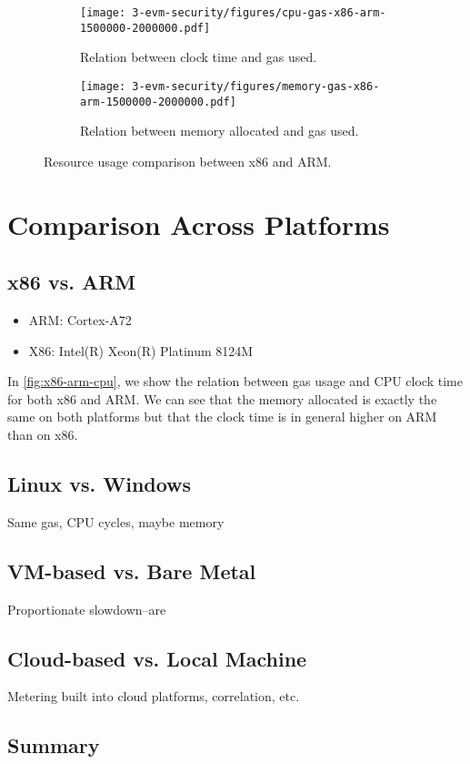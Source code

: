 \begin{figure}[tb]
	\begin{subfigure}{\columnwidth}
		\centering\texttt{[image: 3-evm-security/figures/cpu-gas-x86-arm-1500000-2000000.pdf]}
		\caption{Relation between clock time and gas used.}
		\label{fig:x86-arm-cpu}
	\end{subfigure}

	\begin{subfigure}{\columnwidth}
		\centering\texttt{[image: 3-evm-security/figures/memory-gas-x86-arm-1500000-2000000.pdf]}
		\caption{Relation between memory allocated and gas used.}
		\label{fig:x86-arm-memory}
	\end{subfigure}

	\caption{Resource usage comparison between x86 and ARM.}
	\label{fig:x86-arm}
\end{figure}

\section{Comparison Across Platforms}
\label{sec:cloud}

\subsection{x86 vs. ARM}

\begin{itemize}
	\item ARM: Cortex-A72
	\item X86: Intel(R) Xeon(R) Platinum 8124M
\end{itemize}

In \autoref{fig:x86-arm-cpu}, we show the relation between gas usage and CPU clock time for both x86 and ARM. We can see that the memory allocated is exactly the same on both platforms but that the clock time is in general higher on ARM than on x86.

\subsection{Linux vs. Windows}
Same gas, CPU cycles, maybe memory

\subsection{VM-based vs. Bare Metal}
Proportionate slowdown--are

\subsection{Cloud-based vs. Local Machine}
Metering built into cloud platforms, correlation, etc.

\subsection{Summary}
